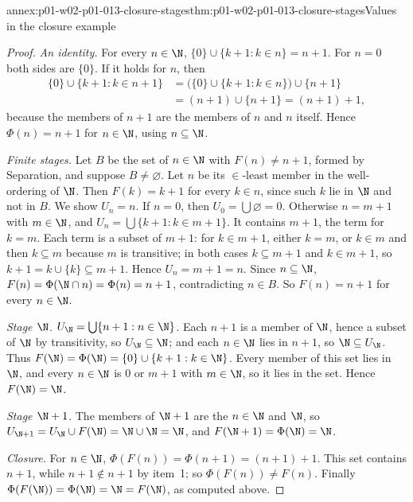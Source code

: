 \begin{annexitem}{annex:p01-w02-p01-013-closure-stages}{thm:p01-w02-p01-013-closure-stages}{Values in the closure example}
\begin{proof}
\emph{An identity.} For every \(n\in\N\),
\(\{0\}\cup\{k+1:k\in n\}=n+1\). For \(n=0\) both sides are \(\{0\}\). If it
holds for \(n\), then
\[
  \begin{aligned}
  \{0\}\cup\{k+1:k\in n+1\}
  &=\bigl(\{0\}\cup\{k+1:k\in n\}\bigr)\cup\{n+1\}\\
  &=(n+1)\cup\{n+1\}=(n+1)+1,
  \end{aligned}
\]
because the members of \(n+1\) are the members of \(n\) and \(n\) itself.
Hence \(\Phi(n)=n+1\) for \(n\in\N\), using \(n\subseteq\N\).

\emph{Finite stages.} Let \(B\) be the set of \(n\in\N\) with
\(F(n)\ne n+1\), formed by Separation, and suppose \(B\ne\varnothing\). Let
\(n\) be its \(\in\)-least member in the well-ordering of \(\N\). Then
\(F(k)=k+1\) for every \(k\in n\), since such \(k\) lie in \(\N\) and not in
\(B\). We show \(U_n=n\). If \(n=0\), then \(U_0=\bigcup\varnothing=0\).
Otherwise \(n=m+1\) with \(m\in\N\), and \(U_n=\bigcup\{k+1:k\in m+1\}\). It
contains \(m+1\), the term for \(k=m\). Each term is a subset of \(m+1\):
for \(k\in m+1\), either \(k=m\), or \(k\in m\) and then \(k\subseteq m\)
because \(m\) is transitive; in both cases \(k\subseteq m+1\) and
\(k\in m+1\), so \(k+1=k\cup\{k\}\subseteq m+1\). Hence \(U_n=m+1=n\). Since
\(n\subseteq\N\), \(F(n)=\Phi(\N\cap n)=\Phi(n)=n+1\), contradicting
\(n\in B\). So \(F(n)=n+1\) for every \(n\in\N\).

\emph{Stage \(\N\).} \(U_\N=\bigcup\{n+1:n\in\N\}\). Each \(n+1\) is a
member of \(\N\), hence a subset of \(\N\) by transitivity, so
\(U_\N\subseteq\N\); and each \(n\in\N\) lies in \(n+1\), so
\(\N\subseteq U_\N\). Thus \(F(\N)=\Phi(\N)=\{0\}\cup\{k+1:k\in\N\}\). Every
member of this set lies in \(\N\), and every \(n\in\N\) is \(0\) or \(m+1\)
with \(m\in\N\), so it lies in the set. Hence \(F(\N)=\N\).

\emph{Stage \(\N+1\).} The members of \(\N+1\) are the \(n\in\N\) and \(\N\),
so \(U_{\N+1}=U_\N\cup F(\N)=\N\cup\N=\N\), and
\(F(\N+1)=\Phi(\N)=\N\).

\emph{Closure.} For \(n\in\N\), \(\Phi(F(n))=\Phi(n+1)=(n+1)+1\). This set
contains \(n+1\), while \(n+1\notin n+1\) by item~1; so
\(\Phi(F(n))\ne F(n)\). Finally \(\Phi(F(\N))=\Phi(\N)=\N=F(\N)\), as
computed above.
\end{proof}
\end{annexitem}

